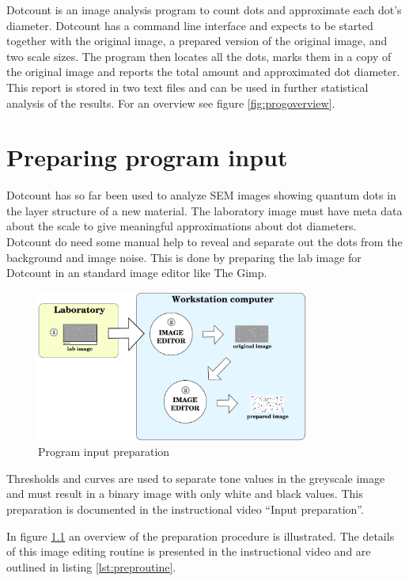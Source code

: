 \documentclass[a4paper,10pt]{book}
\begin{document}
Dotcount is an image analysis program to count dots and approximate each dot's 
diameter. Dotcount has a command line interface and expects to be started
together with the original image, a prepared version of the original image, and
two scale sizes. The program then locates all the dots, marks them in a copy
of the original image and reports the total amount and approximated dot
diameter. This report is stored in two text files and can be used in further
statistical analysis of the results. For an overview see figure
\ref{fig:progoverview}.


\chapter{Preparing program input}
\label{chap:preparing}
Dotcount has so far been used to analyze SEM images showing quantum dots in
the layer structure of a new material. The laboratory image must have meta data
about the scale to give meaningful approximations about dot diameters. Dotcount
do need some manual help to reveal and separate out the dots from the
background and image noise. This is done by preparing the lab image for
Dotcount in an standard image editor like The Gimp. 

\begin{figure}[htb]
\centering
\includegraphics[width=0.8\textwidth]{programinput}
\caption{Program input preparation}
\label{fig:proginput}
\end{figure}

Thresholds and curves are
used to separate tone values in the greyscale image and must result in a binary
image with only white and black values. This preparation is documented in the
instructional video ``Input preparation''.

In figure \ref{fig:proginput} an overview of the preparation procedure is
illustrated. The details of this image editing routine is presented in the
instructional video and are outlined in listing \ref{lst:preproutine}.
\end{document}
